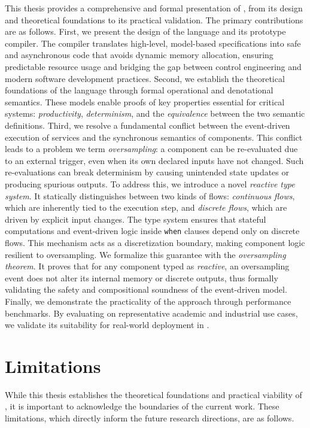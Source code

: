This thesis provides a comprehensive and formal presentation of \GRust, from its design and
theoretical foundations to its practical validation. The primary contributions are as follows.
%
First, we present the design of the \GRust language and its prototype compiler. The compiler
translates high-level, model-based specifications into safe and asynchronous \Rust code that avoids
dynamic memory allocation, ensuring predictable resource usage and bridging the gap between control
engineering and modern software development practices.
%
Second, we establish the theoretical foundations of the language through formal operational and
denotational semantics. These models enable proofs of key properties essential for critical systems:
\emph{productivity}, \emph{determinism}, and the \emph{equivalence} between the two semantic
definitions.
%
Third, we resolve a fundamental conflict between the event-driven execution of services and the
synchronous semantics of components. This conflict leads to a problem we term \emph{oversampling}: a
component can be re-evaluated due to an external trigger, even when its own declared inputs have not
changed. Such re-evaluations can break determinism by causing unintended state updates or producing
spurious outputs.
%
To address this, we introduce a novel \emph{reactive type system}. It statically distinguishes
between two kinds of flows: \emph{continuous flows}, which are inherently tied to the execution
step, and \emph{discrete flows}, which are driven by explicit input changes. The type system ensures
that stateful computations and event-driven logic inside \texttt{when} clauses depend only on
discrete flows. This mechanism acts as a discretization boundary, making component logic resilient
to oversampling. We formalize this guarantee with the \emph{oversampling theorem}. It proves that
for any component typed as \emph{reactive}, an oversampling event does not alter its internal memory
or discrete outputs, thus formally validating the safety and compositional soundness of the
event-driven model.
%
Finally, we demonstrate the practicality of the approach through performance benchmarks. By
evaluating \GRust on representative academic and industrial use cases, we validate its suitability
for real-world deployment in \sdv.

\section{Limitations}
\label{sec:conclusion:limitations}

While this thesis establishes the theoretical foundations and practical viability of \GRust, it is
important to acknowledge the boundaries of the current work. These limitations, which directly
inform the future research directions, are as follows.

